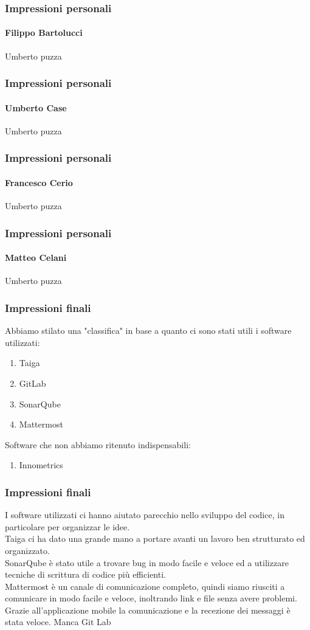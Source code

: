 \documentclass{beamer}
\begin{document}
\begin{frame}
\frametitle{Impressioni personali}
\framesubtitle{Filippo Bartolucci}
Umberto puzza
\end{frame}

\begin{frame}
\frametitle{Impressioni personali}
\framesubtitle{Umberto Case}
Umberto puzza
\end{frame}

\begin{frame}
\frametitle{Impressioni personali}
\framesubtitle{Francesco Cerio}
Umberto puzza
\end{frame}

\begin{frame}
\frametitle{Impressioni personali}
\framesubtitle{Matteo Celani}
Umberto puzza
\end{frame}

\begin{frame}
\frametitle{Impressioni finali}
Abbiamo stilato una "classifica" in base a quanto ci sono stati utili i software utilizzati:
  \begin{enumerate}
	\item Taiga
	\item GitLab
	\item SonarQube
	\item Mattermost
  \end{enumerate}
  Software che non abbiamo ritenuto indispensabili:
  \begin{enumerate}
	\item Innometrics
  \end{enumerate}
\end{frame}

\begin{frame}
\frametitle{Impressioni finali}
I software utilizzati ci hanno aiutato parecchio nello sviluppo del codice, in particolare per organizzar le idee.\\
Taiga ci ha dato una grande mano a portare avanti un lavoro ben strutturato ed organizzato.\\
SonarQube è stato utile a trovare bug in modo facile e veloce ed a utilizzare tecniche di scrittura di codice più efficienti.\\
Mattermost è un canale di comunicazione completo, quindi siamo riusciti a comunicare in modo facile e veloce, inoltrando link e file senza avere problemi. Grazie all'applicazione mobile la comunicazione e la recezione dei messaggi è stata veloce.
Manca Git Lab
\end{frame}
\end{document}
